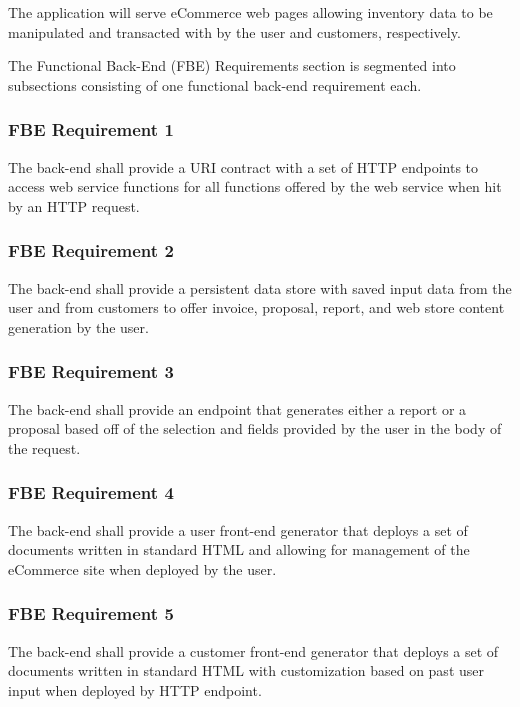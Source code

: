 \documentclass{article}
\begin{document}
The application will serve eCommerce web pages allowing inventory data to be
manipulated and transacted with by the user and customers, respectively.

The Functional Back-End (FBE) Requirements section is segmented into subsections
consisting of one functional back-end requirement each.

\subsubsection{FBE Requirement 1}
\label{func-back-end-1}

The back-end shall provide a URI contract with a set of HTTP endpoints
to access web service functions for all functions offered by the web service
when hit by an HTTP request.

\subsubsection{FBE Requirement 2}
\label{func-back-end-2}

The back-end shall provide a persistent data store with saved input data from
the user and from customers to offer invoice, proposal, report, and web store
content generation by the user.

\subsubsection{FBE Requirement 3}
\label{func-back-end-3}

The back-end shall provide an endpoint that generates either a report or a
proposal based off of the selection and fields provided by the user in the
body of the request.

\subsubsection{FBE Requirement 4}
\label{func-back-end-4}

The back-end shall provide a user front-end generator that deploys a set of
documents written in standard HTML and allowing for management of the eCommerce
site when deployed by the user.

\subsubsection{FBE Requirement 5}
\label{func-back-end-5}

The back-end shall provide a customer front-end generator that deploys a set of
documents written in standard HTML with customization based on past
user input when deployed by HTTP endpoint.
\end{document}
